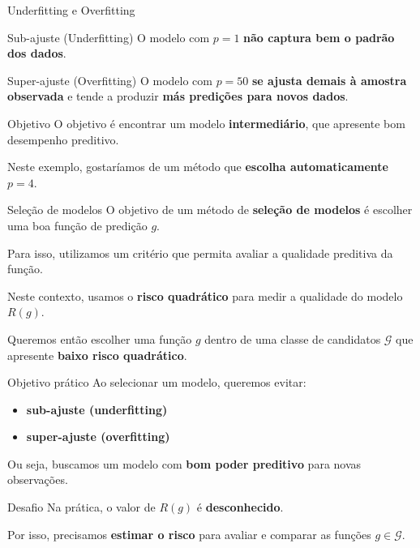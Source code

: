\documentclass[
  ignorenonframetext,
  aspectratio=169,
]{beamer}
\providecommand{\tightlist}{%
  \setlength{\itemsep}{0pt}\setlength{\parskip}{0pt}}
\begin{document}
\begin{frame}{Underfitting e Overfitting}
\label{underfitting-e-overfitting}
\begin{block}{Sub-ajuste (Underfitting)}
\label{sub-ajuste-underfitting}
O modelo com \(p=1\) \textbf{não captura bem o padrão dos dados}.
\end{block}

\begin{block}{Super-ajuste (Overfitting)}
\label{super-ajuste-overfitting}
O modelo com \(p=50\) \textbf{se ajusta demais à amostra observada} e
tende a produzir \textbf{más predições para novos dados}.
\end{block}
\end{frame}

\begin{frame}
\begin{block}{Objetivo}
\label{objetivo-2}
O objetivo é encontrar um modelo \textbf{intermediário}, que apresente
bom desempenho preditivo.

Neste exemplo, gostaríamos de um método que \textbf{escolha
automaticamente} \(p = 4\).
\end{block}
\end{frame}

\begin{frame}{Seleção de modelos}
\label{seleuxe7uxe3o-de-modelos}
O objetivo de um método de \textbf{seleção de modelos} é escolher uma
boa função de predição \(g.\)

Para isso, utilizamos um critério que permita avaliar a qualidade
preditiva da função.

Neste contexto, usamos o \textbf{risco quadrático} para medir a
qualidade do modelo \(R(g).\)

Queremos então escolher uma função \(g\) dentro de uma classe de
candidatos \(\mathcal{G}\) que apresente \textbf{baixo risco
quadrático}.
\end{frame}

\begin{frame}
\begin{block}{Objetivo prático}
\label{objetivo-pruxe1tico}
Ao selecionar um modelo, queremos evitar:

\begin{itemize}
\tightlist
\item
  \textbf{sub-ajuste (underfitting)}\\
\item
  \textbf{super-ajuste (overfitting)}
\end{itemize}

Ou seja, buscamos um modelo com \textbf{bom poder preditivo} para novas
observações.
\end{block}

\begin{block}{Desafio}
\label{desafio}
Na prática, o valor de \(R(g)\) é \textbf{desconhecido}.

Por isso, precisamos \textbf{estimar o risco} para avaliar e comparar as
funções \(g \in \mathcal{G}.\)
\end{block}
\end{frame}
\end{document}
